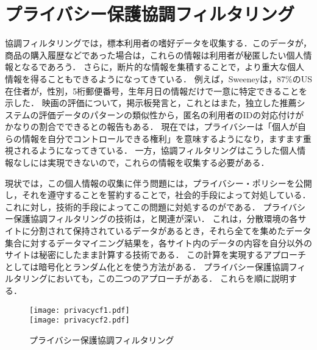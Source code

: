 \chapter{プライバシー保護協調フィルタリング}
\label{chap:privacy}

協調フィルタリングでは，標本利用者の嗜好データを収集する．このデータが，商品の購入履歴などであった場合は，これらの情報は利用者が秘匿したい個人情報となるであろう．
さらに，断片的な情報を集積することで，より重大な個人情報を得ることもできるようになってきている．
例えば，Sweeneyは，87\%のUS在住者が，性別，5桁郵便番号，生年月日の情報だけで一意に特定できることを示した\cite{misc:079}．
映画の評価について，掲示板発言と，これとはまた，独立した推薦システムの評価データのパターンの類似性から，匿名の利用者のIDの対応付けがかなりの割合でできるとの報告もある\cite{sigir:06:05}．
現在では，プライバシーは「個人が自らの情報を自分でコントロールできる権利」\cite{jjsai:06:05}を意味するようになり，ますます重視されるようになってきている．
一方，協調フィルタリングはこうした個人情報なしには実現できないので，これらの情報を収集する必要がある．

現状では，この個人情報の収集に伴う問題には，プライバシー・ポリシーを公開し，それを遵守することを誓約することで，社会的手段によって対処している．
これに対し，技術的手段によってこの問題に対処するのがである．
プライバシー保護協調フィルタリングの技術は，\cite{eb:056:00,jjsai:09:01}と関連が深い．
これは，分散環境の各サイトに分割されて保持されているデータがあるとき，それら全てを集めたデータ集合に対するデータマイニング結果を，各サイト内のデータの内容を自分以外のサイトは秘密にしたまま計算する技術である．
この計算を実現するアプローチとしては暗号化\cite{lncs:00:04}とランダム化\cite{sigmod:00:03}とを使う方法がある．
プライバシー保護協調フィルタリングにおいても，この二つのアプローチがある．
これらを順に説明する．

\begin{figure}
\centering
{}%
{\texttt{[image: privacycf1.pdf]}}\\\bigskip
{}%
{\texttt{[image: privacycf2.pdf]}}
\caption{プライバシー保護協調フィルタリング}
\label{fig:privacycf}
\end{figure}

